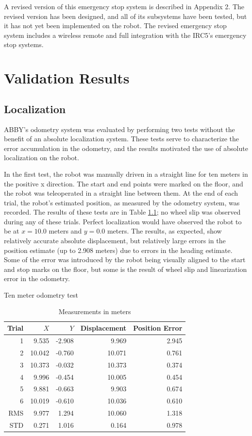 \documentclass[]{cwru} %
\begin{document}
A revised version of this emergency stop system is described in Appendix
2. The revised version has been designed, and all of its subsystems have
been tested, but it has not yet been implemented on the robot. The
revised emergency stop system includes a wireless remote and full
integration with the IRC5's emergency stop systems.

\chapter{Validation Results}

\section{Localization}

ABBY's odometry system was evaluated by performing two tests without the
benefit of an absolute localization system. These tests serve to
characterize the error accumulation in the odometry, and the results
motivated the use of absolute localization on the robot.

In the first test, the robot was manually driven in a straight line for
ten meters in the positive x direction. The start and end points were
marked on the floor, and the robot was teleoperated in a straight line
between them. At the end of each trial, the robot's estimated position,
as measured by the odometry system, was recorded. The results of these
tests are in Table \ref{tab:loc-straight-line}; no wheel slip was observed during any of these
trials. Perfect localization would have observed the robot to be at
$x=10.0$ meters and $y=0.0$ meters. The results, as expected, show
relatively accurate absolute displacement, but relatively large errors
in the position estimate (up to 2.908 meters) due to errors in the
heading estimate. Some of the error was introduced by the robot being
visually aligned to the start and stop marks on the floor, but some is
the result of wheel slip and linearization error in the odometry.

\begin{table}
\caption{Ten meter odometry test}
\label{tab:loc-straight-line}
\begin{tabular}[c]{rrrrr}
\toprule
\textbf{Trial} & \textbf{$X$} & \textbf{$Y$} & \textbf{Displacement} & \textbf{Position Error} \tabularnewline
\midrule
1   &  9.535 & -2.908 &  9.969 & 2.945\tabularnewline
2   & 10.042 & -0.760 & 10.071 & 0.761\tabularnewline
3   & 10.373 & -0.032 & 10.373 & 0.374\tabularnewline
4   &  9.996 & -0.454 & 10.005 & 0.454\tabularnewline
5   &  9.881 & -0.663 &  9.903 & 0.674\tabularnewline
6   & 10.019 & -0.610 & 10.036 & 0.610\tabularnewline
\midrule
RMS &  9.977 &  1.294 & 10.060 & 1.318\tabularnewline
\midrule
STD &  0.271 &  1.016 &  0.164 & 0.978\tabularnewline
\bottomrule
\end{tabular}
\caption*{Measurements in meters}
\end{table}
\end{document}
